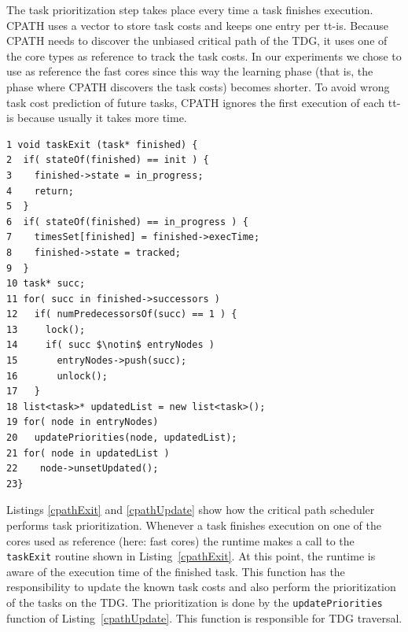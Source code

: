 
The task prioritization step takes place every time a task finishes execution. 
CPATH uses a vector to store task costs and keeps one entry per tt-is.
Because CPATH needs to discover the unbiased critical path of the TDG, it uses one of the core types as reference to track the task costs.
In our experiments we chose to use as reference the fast cores since this way the learning phase (that is, the phase where CPATH discovers the task costs) becomes shorter.
To avoid wrong task cost prediction of future tasks, CPATH ignores the first execution of each tt-is because usually it takes more time. 
\begin{lstlisting}[float, emph={for,in,void,if,return,updatePriorities,non_critical_queue, critical_queue,submit_task}, captionpos=b, caption={Pseudo-code for taskExit, the function called by the cores used as reference for tracking the task costs},label=cpathExit, emph={[2]mat}, emphstyle={[2]}, aboveskip={0\baselineskip}, frame=tb, belowskip={-0.4cm}]
1 void taskExit (task* finished) {
2  if( stateOf(finished) == init ) {
3    finished->state = in_progress;
4    return;
5  }
6  if( stateOf(finished) == in_progress ) {
7    timesSet[finished] = finished->execTime;
8    finished->state = tracked;
9  }
10 task* succ;
11 for( succ in finished->successors ) 
12   if( numPredecessorsOf(succ) == 1 ) {
13     lock();
14     if( succ $\notin$ entryNodes ) 
15       entryNodes->push(succ);
16       unlock();
17   }
18 list<task>* updatedList = new list<task>();
19 for( node in entryNodes) 
20   updatePriorities(node, updatedList);
21 for( node in updatedList ) 
22    node->unsetUpdated();
23}
\end{lstlisting}

Listings \ref{cpathExit} and \ref{cpathUpdate} show how the critical path scheduler performs task prioritization.
Whenever a task finishes execution on one of the cores used as reference (here: fast cores) the runtime makes a call to the \texttt{taskExit} routine shown in Listing~\ref{cpathExit}.
At this point, the runtime is aware of the execution time of the finished task.
This function has the responsibility to update the known task costs and also perform the prioritization of the tasks on the TDG.
The prioritization is done by the \texttt{updatePriorities} function of Listing~\ref{cpathUpdate}. 
This function is responsible for TDG traversal.

